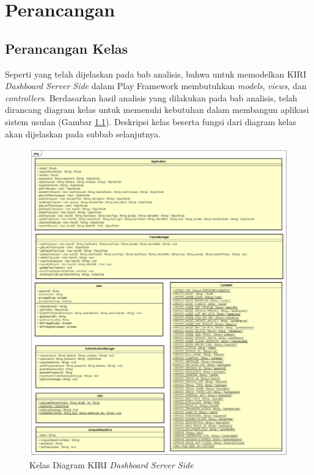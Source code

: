\chapter{Perancangan}
\label{chap:perancangan}

\section{Perancangan Kelas}
\label{sec:diagramkelas}
Seperti yang telah dijelaskan pada bab analisis, bahwa untuk memodelkan KIRI \textit{Dashboard Server Side} dalam Play Framework membutuhkan \textit{models}, \textit{views}, dan \textit{controllers}. Berdasarkan hasil analisis yang dilakukan pada bab analisis, telah dirancang diagram kelas untuk memenuhi kebutuhan dalam membangun aplikasi sistem usulan (Gambar \ref{fig:4_classdiagram}). Deskripsi kelas beserta fungsi dari diagram kelas akan dijelaskan pada subbab selanjutnya.

\begin{figure}[htbp]
	\centering
		\includegraphics[scale=0.45]{Gambar/4_classdiagram.png}
	\caption{Kelas Diagram KIRI \textit{Dashboard Server Side}}
	\label{fig:4_classdiagram}
\end{figure}


